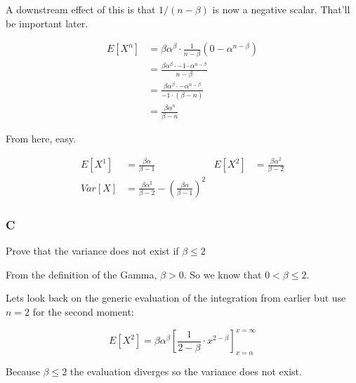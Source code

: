 A downstream effect of this is that $1/(n - \beta)$ is now a negative scalar. That'll be important later.

\begin{align*}
	E[X^n] &= \beta \alpha^{\beta} \cdot \frac{1}{n-\beta} \left( 0 - \alpha^{n - \beta} \right) \\
	&= \frac{\beta \alpha^{\beta} \cdot -1 \cdot \alpha^{n-\beta}}{n-\beta} \\
	&= \frac{\beta \alpha^{\beta} \cdot -\alpha^{n-\beta}}{-1 \cdot (\beta - n)} \\
	&= \frac{\beta \alpha^n}{\beta - n}
\end{align*}

From here, easy.

\begin{align*}
	E[X^1] &= \frac{\beta \alpha}{\beta - 1} & E[X^2] &= \frac{\beta \alpha^2}{\beta - 2} \\
	Var[X] &= \frac{\beta \alpha^2}{\beta - 2} - \left(\frac{\beta \alpha}{\beta - 1}\right)^2
\end{align*}

\subsubsection*{C}

Prove that the variance does not exist if $\beta \leq 2$

From the definition of the Gamma, $\beta > 0$. So we know that $0 < \beta \leq 2$. 

Lets look back on the generic evaluation of the integration from earlier but use $n=2$ for the second moment:

\[
	E[X^2] =  \beta \alpha^{\beta} \left[ \frac{1}{2 - \beta} \cdot x^{2-\beta} \right]_{x=\alpha}^{x=\infty}
\]

Because $\beta \leq 2$ the evaluation diverges so the variance does not exist.
